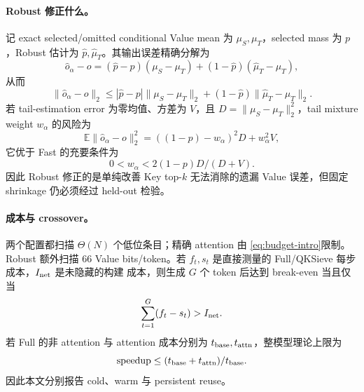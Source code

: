 \paragraph{Robust 修正什么。}
记 exact selected/omitted conditional Value mean 为 $\mu_S,\mu_T$，selected
mass 为 $p$，Robust 估计为 $\widehat p,\widehat\mu_T$。其输出误差精确分解为
\begin{equation}
 \widehat o_\alpha-o=(\widehat p-p)(\mu_S-\mu_T)
 +(1-\widehat p)(\widehat\mu_T-\mu_T),
 \label{eq:tail-error-decomposition}
\end{equation}
从而
\begin{equation}
 \|\widehat o_\alpha-o\|_2\le
 |\widehat p-p|\|\mu_S-\mu_T\|_2
 +(1-\widehat p)\|\widehat\mu_T-\mu_T\|_2.
 \label{eq:tail-error-bound}
\end{equation}
若 tail-estimation error 为零均值、方差为 $V$，且
$D=\|\mu_S-\mu_T\|_2^2$，tail mixture weight $w_\alpha$ 的风险为
\begin{equation}
 \mathbb E\|\widehat o_\alpha-o\|_2^2
 =((1-p)-w_\alpha)^2D+w_\alpha^2V,
 \label{eq:tail-bias-variance}
\end{equation}
它优于 Fast 的充要条件为
\begin{equation}
 0<w_\alpha<2(1-p)D/(D+V).
 \label{eq:tail-correction-benefit}
\end{equation}
因此 Robust 修正的是单纯改善 Key top-$k$ 无法消除的遗漏 Value 误差，但固定
shrinkage 仍必须经过 held-out 检验。

\paragraph{成本与 crossover。}
两个配置都扫描 $\Theta(N)$ 个低位条目；精确 attention 由
\cref{eq:budget-intro}限制。Robust 额外扫描 66 Value bits/token。若
$f_t,s_t$ 是直接测量的 Full/QKSieve 每步成本，$I_{\rm net}$ 是未隐藏的构建
成本，则生成 $G$ 个 token 后达到 break-even 当且仅当
\begin{equation}
 \sum_{t=1}^{G}(f_t-s_t)>I_{\rm net}.
 \label{eq:main-break-even}
\end{equation}
若 Full 的非 attention 与 attention 成本分别为
$t_{\rm base},t_{\rm attn}$，整模型理论上限为
\begin{equation}
 \mathrm{speedup}\le(t_{\rm base}+t_{\rm attn})/t_{\rm base}.
 \label{eq:main-amdahl}
\end{equation}
因此本文分别报告 cold、warm 与 persistent reuse。
